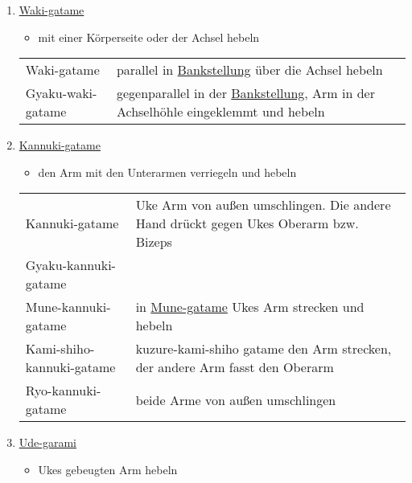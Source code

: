 \documentclass[justified, a4paper, notitlepage, captions=tableheading, nobib]{tufte-handout}
\begin{document}
\begin{enumerate}
\item \hyperref[orgef65a86]{Waki-gatame}
\label{sec:org96e0df8}

\begin{itemize}
\item mit einer Körperseite oder der Achsel hebeln
\end{itemize}

\begin{center}
\begin{tabular}{ll}
\label{orgef65a86}Waki-gatame & parallel in \hyperref[orgf15b76f]{Bankstellung} über die Achsel hebeln\\
\label{orga3b3020}Gyaku-waki-gatame & gegenparallel in der \hyperref[orgf15b76f]{Bankstellung}, Arm in der Achselhöhle eingeklemmt und hebeln\\
\end{tabular}
\end{center}

\item \hyperref[org4348818]{Kannuki-gatame}
\label{sec:orgc20ec1e}

\begin{itemize}
\item den Arm mit den Unterarmen verriegeln und hebeln
\end{itemize}

\begin{center}
\begin{tabular}{ll}
\label{org4348818}Kannuki-gatame & Uke Arm von außen umschlingen. Die andere Hand drückt gegen Ukes Oberarm bzw. Bizeps\\
\label{orgf17188b}Gyaku-kannuki-gatame & \\
\label{org9ae3228}Mune-kannuki-gatame & in \hyperref[org671197b]{Mune-gatame} Ukes Arm strecken und hebeln\\
\label{orgdc60222}Kami-shiho-kannuki-gatame & kuzure-kami-shiho gatame den Arm strecken, der andere Arm fasst den Oberarm\\
\label{org7761768}Ryo-kannuki-gatame & beide Arme von außen umschlingen\\
\end{tabular}
\end{center}

\item \hyperref[org52f11cf]{Ude-garami}
\label{sec:orgd43133a}

\begin{itemize}
\item Ukes gebeugten Arm hebeln
\end{itemize}


\end{enumerate}
\end{document}
